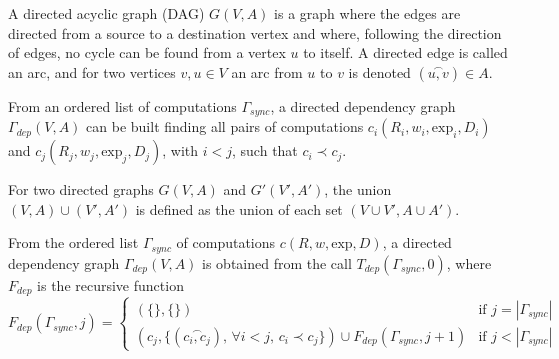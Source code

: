 

\begin{mydef}
A directed acyclic graph (DAG) $G(V,A)$ is a graph where the edges are directed from a source to a destination vertex and where, following the direction of edges, no cycle can be found from a vertex $u$ to itself. A directed edge is called an arc, and for two vertices $v,u \in V$ an arc from $u$ to $v$ is denoted $(\overset{\frown}{u,v}) \in A$.
\end{mydef}

From an ordered list of computations $\Gamma_{sync}$, a directed dependency graph $\Gamma_{dep}(V,A)$ can be built finding all pairs of computations $c_i(R_i,w_i,\text{exp}_i,D_i)$ and $c_j(R_j,w_j,\text{exp}_j,D_j)$, with $i<j$, such that $c_i \prec c_j$. %

\begin{mydef}
For two directed graphs $G(V,A)$ and $G'(V',A')$, the union $(V,A)\cup (V',A')$ is defined as the union of each set $(V\cup V', A \cup A')$.
\end{mydef}

\begin{mydef}
From the ordered list $\Gamma_{sync}$ of computations $c(R,w,\text{exp},D)$, a directed dependency graph $\Gamma_{dep}(V,A)$ is obtained from the call $T_{dep}(\Gamma_{sync},0)$, where $F_{dep}$ is the recursive function
\begin{equation*}
F_{dep}(\Gamma_{sync},j) = 
\begin{cases} 	(\{\},\{\}) & \mbox{if }j=|\Gamma_{sync}|\\
				(c_j, \{(\overset{\frown}{c_i,c_j})\mbox{, }\forall i < j \mbox{, } c_i\prec c_j \})\cup F_{dep}(\Gamma_{sync},j+1) & \mbox{if }j<|\Gamma_{sync}|
\end{cases}
\end{equation*}
\end{mydef}

